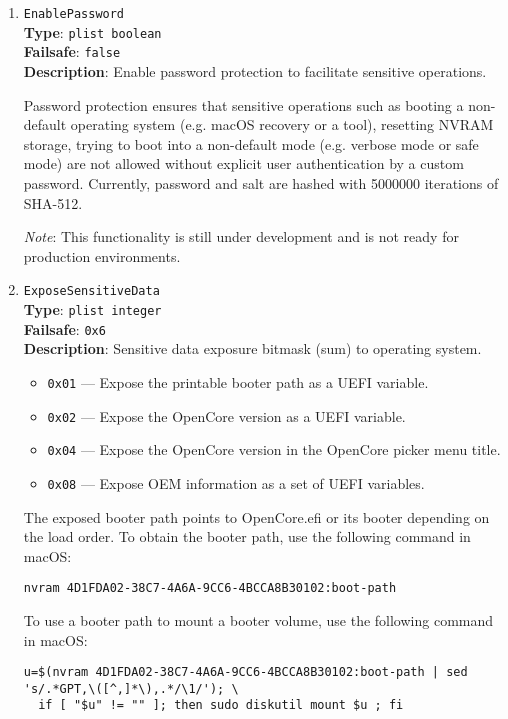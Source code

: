 \documentclass[]{article}
\providecommand{\tightlist}{%
  \setlength{\itemsep}{0pt}\setlength{\parskip}{0pt}}
\begin{document}
\begin{enumerate}
\item
  \texttt{EnablePassword}\\
  \textbf{Type}: \texttt{plist\ boolean}\\
  \textbf{Failsafe}: \texttt{false}\\
  \textbf{Description}: Enable password protection to facilitate sensitive operations.

  Password protection ensures that sensitive operations such as booting a non-default
  operating system (e.g. macOS recovery or a tool), resetting NVRAM storage,
  trying to boot into a non-default mode (e.g. verbose mode or safe mode) are not
  allowed without explicit user authentication by a custom password. Currently,
  password and salt are hashed with 5000000 iterations of SHA-512.

  \emph{Note}: This functionality is still under development and is not ready for
  production environments.

\item
  \texttt{ExposeSensitiveData}\\
  \textbf{Type}: \texttt{plist\ integer}\\
  \textbf{Failsafe}: \texttt{0x6}\\
  \textbf{Description}: Sensitive data exposure bitmask (sum) to operating system.

  \begin{itemize}
  \tightlist
    \item \texttt{0x01} --- Expose the printable booter path as a UEFI variable.
    \item \texttt{0x02} --- Expose the OpenCore version as a UEFI variable.
    \item \texttt{0x04} --- Expose the OpenCore version in the OpenCore picker menu title.
    \item \texttt{0x08} --- Expose OEM information as a set of UEFI variables.
  \end{itemize}

  The exposed booter path points to OpenCore.efi or its booter depending on the load order.
  To obtain the booter path, use the following command in macOS:
\begin{lstlisting}[label=nvrampath, style=ocbash]
nvram 4D1FDA02-38C7-4A6A-9CC6-4BCCA8B30102:boot-path
\end{lstlisting}

  To use a booter path to mount a booter volume, use the following command in macOS:
\begin{lstlisting}[label=nvrampathmount, style=ocbash]
u=$(nvram 4D1FDA02-38C7-4A6A-9CC6-4BCCA8B30102:boot-path | sed 's/.*GPT,\([^,]*\),.*/\1/'); \
  if [ "$u" != "" ]; then sudo diskutil mount $u ; fi
\end{lstlisting}


\end{enumerate}
\end{document}
